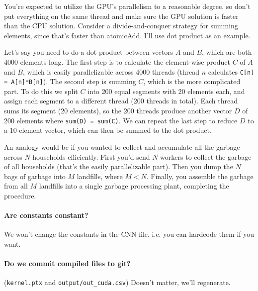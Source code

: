 You're expected to utilize the GPU's parallelism to a reasonable degree, so don't put everything on the same thread and make sure the GPU solution is faster than the CPU solution. Consider a divide-and-conquer strategy for summing elements, since that's faster than atomicAdd. I'll use dot product as an example.

Let's say you need to do a dot product between vectors $A$ and $B$, which are both 4000 elements long. The first step is to calculate the element-wise product $C$ of $A$ and $B$, which is easily parallelizable across 4000 threads (thread $n$ calculates \texttt{C[n] = A[n]*B[n]}). The second step is summing $C$, which is the more complicated part. To do this we split $C$ into 200 equal segments with 20 elements each, and assign each segment to a different thread (200 threads in total). Each thread sums its segment (20 elements), so the 200 threads produce another vector $D$ of 200 elements where \texttt{sum(D) = sum(C)}. We can repeat the last step to reduce $D$ to a 10-element vector, which can then be summed to the dot product.

An analogy would be if you wanted to collect and accumulate all the garbage across $N$ households efficiently. First you'd send $N$ workers to collect the garbage of all households (that's the easily parallelizable part). Then you dump the $N$ bags of garbage into $M$ landfills, where $M < N$. Finally, you assemble the garbage from all $M$ landfills into a single garbage processing plant, completing the procedure.

\paragraph{Are constants constant?} We won't change the constants in the CNN file, i.e. you can hardcode them if you want.

\paragraph{Do we commit compiled files to git?} (\verb+kernel.ptx+ and \verb+output/out_cuda.csv+) Doesn't matter, we'll regenerate.


